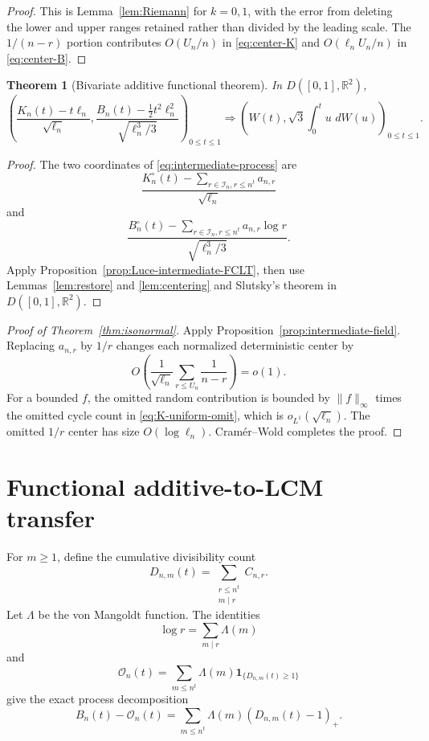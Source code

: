 \documentclass[11pt]{article}
\newtheorem{theorem}{Theorem}[section]
\theoremstyle{definition}
\theoremstyle{remark}
\newcommand{\one}{\mathbf 1}
\newcommand{\dd}{\,d}
\newcommand{\cO}{\mathcal O}
\newcommand{\cI}{\mathcal I}
\newcommand{\R}{\mathbb R}
\begin{document}
\begin{proof}
This is Lemma~\ref{lem:Riemann} for $k=0,1$, with the error from deleting the
lower and upper ranges retained rather than divided by the leading scale.
The $1/(n-r)$ portion contributes $O(U_n/n)$ in \eqref{eq:center-K} and
$O(\ell_nU_n/n)$ in \eqref{eq:center-B}.
\end{proof}

\begin{theorem}[Bivariate additive functional theorem]
\label{thm:additive-functional}
In $D([0,1],\R^2)$,
\begin{equation}\label{eq:additive-functional}
 \boxed{
 \left(
 \frac{K_n(t)-t\ell_n}{\sqrt{\ell_n}},
 \frac{B_n(t)-\frac12t^2\ell_n^2}{\sqrt{\ell_n^3/3}}
 \right)_{0\le t\le1}
 \Rightarrow
 \left(
 W(t),\sqrt3\int_0^t u\,\dd W(u)
 \right)_{0\le t\le1}.}
\end{equation}
\end{theorem}

\begin{proof}
The two coordinates of \eqref{eq:intermediate-process} are
\[
 \frac{K_n^\circ(t)-\sum_{r\in\cI_n,r\le n^t}a_{n,r}}
      {\sqrt{\ell_n}}
\]
and
\[
 \frac{B_n^\circ(t)-\sum_{r\in\cI_n,r\le n^t}a_{n,r}\log r}
      {\sqrt{\ell_n^3/3}}.
\]
Apply Proposition~\ref{prop:Luce-intermediate-FCLT}, then use
Lemmas~\ref{lem:restore} and \ref{lem:centering} and Slutsky's theorem in
$D([0,1],\R^2)$.
\end{proof}

\begin{proof}[Proof of Theorem~\ref{thm:isonormal}]
Apply Proposition~\ref{prop:intermediate-field}.  Replacing $a_{n,r}$ by
$1/r$ changes each normalized deterministic center by
\[
 O\left(\frac1{\sqrt{\ell_n}}\sum_{r\le U_n}\frac1{n-r}\right)=o(1).
\]
For a bounded $f$, the omitted random contribution is bounded by
$\|f\|_\infty$ times the omitted cycle count in
\eqref{eq:K-uniform-omit}, which is $o_{L^1}(\sqrt{\ell_n})$.  The omitted
$1/r$ center has size $O(\log\ell_n)$.  Cram\'er--Wold completes the proof.
\end{proof}

\section{Functional additive-to-LCM transfer}

For $m\ge1$, define the cumulative divisibility count
\begin{equation}\label{eq:Dmt}
 D_{n,m}(t)=\sum_{\substack{r\le n^t\\m\mid r}}C_{n,r}.
\end{equation}
Let $\Lambda$ be the von Mangoldt function.  The identities
\[
 \log r=\sum_{m\mid r}\Lambda(m)
\]
and
\[
 \cO_n(t)=\sum_{m\le n^t}\Lambda(m)
 \one_{\{D_{n,m}(t)\ge1\}}
\]
give the exact process decomposition
\begin{equation}\label{eq:process-vonmangoldt}
 B_n(t)-\cO_n(t)
 =\sum_{m\le n^t}\Lambda(m)(D_{n,m}(t)-1)_+.
\end{equation}
\end{document}
